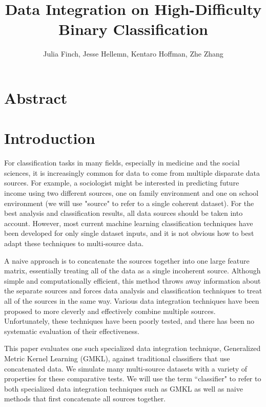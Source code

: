 \documentclass{article}
\begin{document}
\title{Data Integration on High-Difficulty Binary Classification}
\author{Julia Finch, Jesse Hellemn, Kentaro Hoffman, Zhe Zhang}
\maketitle


\section*{Abstract}


\section*{Introduction}
For classification tasks in many fields, especially in medicine and the social
sciences, it is increasingly common for data to come from multiple disparate
data sources. For example, a sociologist might be interested in predicting
future income using two different sources, one on family environment and one on
school environment (we will use "source" to refer to a single coherent
dataset). For the best analysis and classification results, all data sources
should be taken into account. However, most current machine learning
classification techniques have been developed for only single dataset inputs,
and it is not obvious how to best adapt these techniques to multi-source data.

A naive approach is to concatenate the sources together into one large feature
matrix, essentially treating all of the data as a single incoherent source.
Although simple and computationally efficient, this method throws away
information about the separate sources and forces data analysis and
classification techniques to treat all of the sources in the same way. Various
data integration techniques have been proposed to more cleverly and effectively
combine multiple sources. Unfortunately, these techniques have been poorly
tested, and there has been no systematic evaluation of their effectiveness.

This paper evaluates one such specialized data integration technique,
Generalized Metric Kernel Learning (GMKL), against traditional classifiers that
use concatenated data. We simulate many multi-source datasets with a variety of
properties for these comparative tests. We will use the term ``classifier" to
refer to both specialized data integration techniques such as GMKL as well as
naive methods that first concatenate all sources together.
\end{document}
